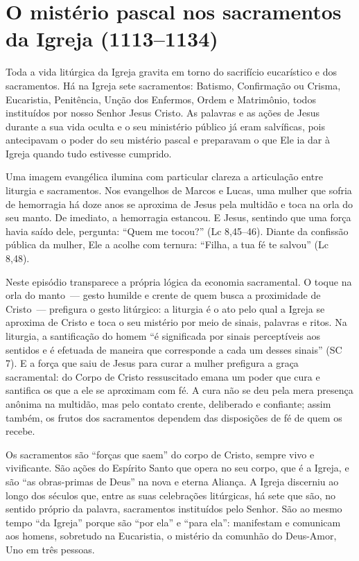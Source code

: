 \section{O mistério pascal nos sacramentos da Igreja (1113--1134)}

Toda a vida litúrgica da Igreja gravita em torno do sacrifício eucarístico e dos sacramentos. Há na Igreja sete sacramentos: Batismo, Confirmação ou Crisma, Eucaristia, Penitência, Unção dos Enfermos, Ordem e Matrimônio, todos instituídos por nosso Senhor Jesus Cristo. As palavras e as ações de Jesus durante a sua vida oculta e o seu ministério público já eram salvíficas, pois antecipavam o poder do seu mistério pascal e preparavam o que Ele ia dar à Igreja quando tudo estivesse cumprido.

Uma imagem evangélica ilumina com particular clareza a articulação entre liturgia e sacramentos. Nos evangelhos de Marcos e Lucas, uma mulher que sofria de hemorragia há doze anos se aproxima de Jesus pela multidão e toca na orla do seu manto. De imediato, a hemorragia estancou. E Jesus, sentindo que uma força havia saído dele, pergunta: ``Quem me tocou?'' (Lc 8,45--46). Diante da confissão pública da mulher, Ele a acolhe com ternura: ``Filha, a tua fé te salvou'' (Lc 8,48).

Neste episódio transparece a própria lógica da economia sacramental. O toque na orla do manto~--- gesto humilde e crente de quem busca a proximidade de Cristo~--- prefigura o gesto litúrgico: a liturgia é o ato pelo qual a Igreja se aproxima de Cristo e toca o seu mistério por meio de sinais, palavras e ritos. Na liturgia, a santificação do homem ``é significada por sinais perceptíveis aos sentidos e é efetuada de maneira que corresponde a cada um desses sinais'' (SC 7). E a força que saiu de Jesus para curar a mulher prefigura a graça sacramental: do Corpo de Cristo ressuscitado emana um poder que cura e santifica os que a ele se aproximam com fé. A cura não se deu pela mera presença anônima na multidão, mas pelo contato crente, deliberado e confiante; assim também, os frutos dos sacramentos dependem das disposições de fé de quem os recebe.

Os sacramentos são ``forças que saem'' do corpo de Cristo, sempre vivo e vivificante. São ações do Espírito Santo que opera no seu corpo, que é a Igreja, e são ``as obras-primas de Deus'' na nova e eterna Aliança. A Igreja discerniu ao longo dos séculos que, entre as suas celebrações litúrgicas, há sete que são, no sentido próprio da palavra, sacramentos instituídos pelo Senhor. São ao mesmo tempo ``da Igreja'' porque são ``por ela'' e ``para ela'': manifestam e comunicam aos homens, sobretudo na Eucaristia, o mistério da comunhão do Deus-Amor, Uno em três pessoas.

